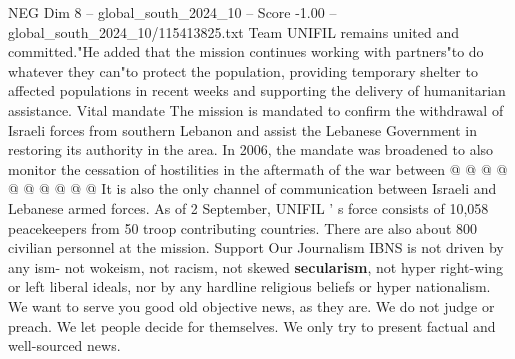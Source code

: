 \begin{textsample}{NEG Dim 8 – global\_south\_2024\_10 – Score -1.00 – global\_south\_2024\_10/115413825.txt}
Team UNIFIL remains united and committed."He added that the mission continues working with partners"to do whatever they can"to protect the population, providing temporary shelter to affected populations in recent weeks and supporting the delivery of humanitarian assistance.
Vital mandate The mission is mandated to confirm the withdrawal of Israeli forces from southern Lebanon and assist the Lebanese Government in restoring its authority in the area.
In 2006, the mandate was broadened to also monitor the cessation of hostilities in the aftermath of the war between @ @ @ @ @ @ @ @ @ @ It is also the only channel of communication between Israeli and Lebanese armed forces.
As of 2 September, UNIFIL ' s force consists of 10,058 peacekeepers from 50 troop contributing countries.
There are also about 800 civilian personnel at the mission.
Support Our Journalism IBNS is not driven by any ism- not wokeism, not racism, not skewed \textbf{secularism}, not hyper right-wing or left liberal ideals, nor by any hardline religious beliefs or hyper nationalism.
We want to serve you good old objective news, as they are.
We do not judge or preach.
We let people decide for themselves.
We only try to present factual and well-sourced news.

\end{textsample}

